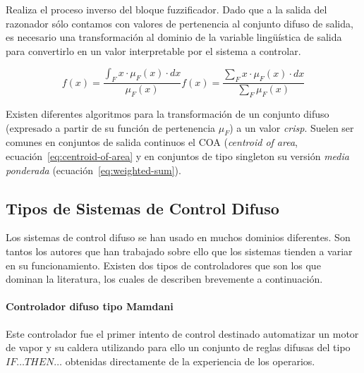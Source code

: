 Realiza el proceso inverso del bloque fuzzificador. Dado que a la salida del razonador sólo contamos con valores de pertenencia al conjunto difuso de salida, es necesario una transformación al dominio de la variable lingüística de salida para convertirlo en un valor interpretable por el sistema a controlar.

\begin{subequations}
	\begin{equation}
		f(x) = \frac{\int_{F} x \cdot \mu_F(x) \cdot dx}{\mu_F(x)}
		\label{eq:centroid-of-area}
	\end{equation}
	\begin{equation}
		f(x) = \frac{\sum_{F} x \cdot \mu_F(x) \cdot dx}{\sum_{F} \mu_F(x)}
		\label{eq:weighted-sum}
	\end{equation}
\end{subequations}

Existen diferentes algoritmos para la transformación de un conjunto difuso (expresado a partir de su función de pertenencia $\mu_F$) a un valor \textit{crisp}. Suelen ser comunes en conjuntos de salida continuos el COA (\textit{centroid of area}, ecuación~\ref{eq:centroid-of-area} y en conjuntos de tipo singleton su versión \textit{media ponderada} (ecuación~\ref{eq:weighted-sum}).

\subsection{Tipos de Sistemas de Control Difuso}

Los sistemas de control difuso se han usado en muchos dominios diferentes. Son tantos los autores que han trabajado sobre ello que los sistemas tienden a variar en su funcionamiento. Existen dos tipos de controladores que son los que dominan la literatura, los cuales de describen brevemente a continuación.

\paragraph{Controlador difuso tipo Mamdani}

Este controlador fue el primer intento de control destinado automatizar un motor de vapor y su caldera utilizando para ello un conjunto de reglas difusas del tipo \texttt{$IF \ldots THEN \ldots$} obtenidas directamente de la experiencia de los operarios.

